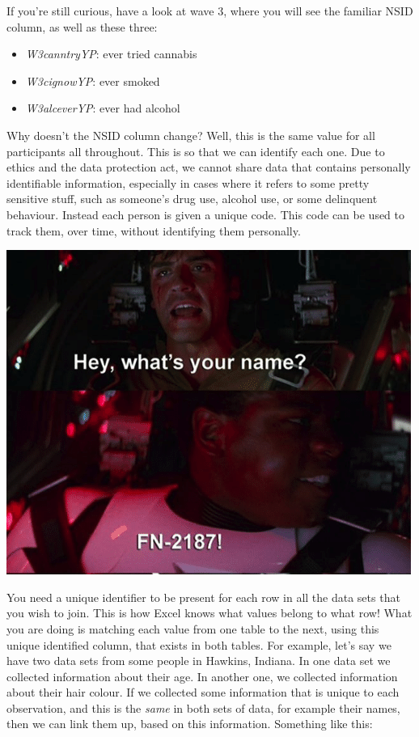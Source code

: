 \documentclass[
]{book}
\providecommand{\tightlist}{%
  \setlength{\itemsep}{0pt}\setlength{\parskip}{0pt}}
\begin{document}
If you're still curious, have a look at wave 3, where you will see the familiar NSID column, as well as these three:

\begin{itemize}
\tightlist
\item
  \emph{W3canntryYP}: ever tried cannabis\\
\item
  \emph{W3cignowYP}: ever smoked
\item
  \emph{W3alceverYP}: ever had alcohol
\end{itemize}

Why doesn't the NSID column change? Well, this is the same value for all participants all throughout. This is so that we can identify each one. Due to ethics and the data protection act, we cannot share data that contains personally identifiable information, especially in cases where it refers to some pretty sensitive stuff, such as someone's drug use, alcohol use, or some delinquent behaviour. Instead each person is given a unique code. This code can be used to track them, over time, without identifying them personally.

\includegraphics{imgs/fn2187.png}

You need a unique identifier to be present for each row in all the data sets that you wish to join. This is how Excel knows what values belong to what row! What you are doing is matching each value from one table to the next, using this unique identified column, that exists in both tables. For example, let's say we have two data sets from some people in Hawkins, Indiana. In one data set we collected information about their age. In another one, we collected information about their hair colour. If we collected some information that is unique to each observation, and this is the \emph{same} in both sets of data, for example their names, then we can link them up, based on this information. Something like this:
\end{document}
